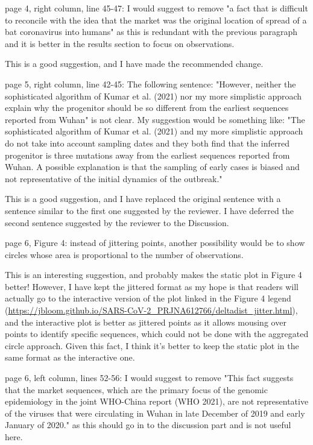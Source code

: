 \documentclass[11pt, oneside]{article}   	%
\newcommand{\response}[1]{{\color{black}#1}}
\begin{document}
page 4, right column, line 45-47: I would suggest to remove "a fact that is difficult to reconcile with the idea that the market was the original location of spread of a bat coronavirus into humans" as this is redundant with the previous paragraph and it is better in the results section to focus on observations.

\response{This is a good suggestion, and I have made the recommended change.}

page 5, right column, line 42-45: The following sentence: "However, neither the sophisticated algorithm of Kumar et al. (2021) nor my more simplistic approach explain why the progenitor should be so different from the earliest sequences reported from Wuhan" is not clear. My suggestion would be something like: "The sophisticated algorithm of Kumar et al. (2021) and my more simplistic approach do not take into account sampling dates and they both find that the inferred progenitor is three mutations away from the earliest sequences reported from Wuhan. A possible explanation is that the sampling of early cases is biased and not representative of the initial dynamics of the outbreak."

\response{This is a good suggestion, and I have replaced the original sentence with a sentence similar to the first one suggested by the reviewer. I have deferred the second sentence suggested by the reviewer to the Discussion.}

page 6, Figure 4: instead of jittering points, another possibility would be to show circles whose area is proportional to the number of observations.

\response{This is an interesting suggestion, and probably makes the static plot in Figure 4 better! However, I have kept the jittered format as my hope is that readers will actually go to the interactive version of the plot linked in the Figure 4 legend (\url{https://jbloom.github.io/SARS-CoV-2_PRJNA612766/deltadist_jitter.html}), and the interactive plot is better as jittered points as it allows mousing over points to identify specific sequences, which could not be done with the aggregated circle approach. Given this fact, I think it's better to keep the static plot in the same format as the interactive one.}

page 6, left column, lines 52-56: I would suggest to remove "This fact suggests that the market sequences, which are the primary focus of the genomic epidemiology in the joint WHO-China report (WHO 2021), are not representative of the viruses that were circulating in Wuhan in late December of 2019 and early January of 2020." as this should go in to the discussion part and is not useful here.
\end{document}
